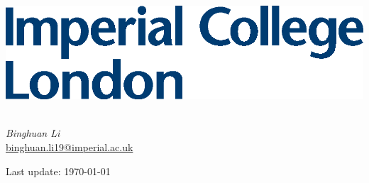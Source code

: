 
\begin{titlepage}
\Large

\begin{minipage}{0.4\textwidth}
    \includegraphics[width=\textwidth]{images/Imperial.eps}
\end{minipage}

\vspace{1.5cm}

\begin{center}
        \vspace{2cm}
        {\Huge \textbf{\textit{\doc}}}\\
        \vspace{5cm}
        \textit{Binghuan Li}\\
        \href{mailto:binghuan.li19@imperial.ac.uk}{binghuan.li19@imperial.ac.uk}

        \vspace{3cm}
        Last update: \today
        \vfill
\end{center}

\end{titlepage}